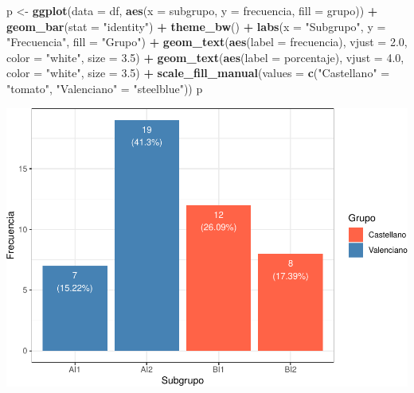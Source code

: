 \documentclass[
]{article}
\newenvironment{Shaded}{\begin{snugshade}}{\end{snugshade}}
\newcommand{\AttributeTok}[1]{\textcolor[rgb]{0.13,0.29,0.53}{#1}}
\newcommand{\FloatTok}[1]{\textcolor[rgb]{0.00,0.00,0.81}{#1}}
\newcommand{\FunctionTok}[1]{\textcolor[rgb]{0.13,0.29,0.53}{\textbf{#1}}}
\newcommand{\NormalTok}[1]{#1}
\newcommand{\OtherTok}[1]{\textcolor[rgb]{0.56,0.35,0.01}{#1}}
\newcommand{\SpecialCharTok}[1]{\textcolor[rgb]{0.81,0.36,0.00}{\textbf{#1}}}
\newcommand{\StringTok}[1]{\textcolor[rgb]{0.31,0.60,0.02}{#1}}
\begin{document}
\begin{Shaded}
\begin{Highlighting}[]
\NormalTok{p }\OtherTok{\textless{}{-}} \FunctionTok{ggplot}\NormalTok{(}\AttributeTok{data =}\NormalTok{ df, }\FunctionTok{aes}\NormalTok{(}\AttributeTok{x =}\NormalTok{ subgrupo, }\AttributeTok{y =}\NormalTok{ frecuencia, }\AttributeTok{fill =}\NormalTok{ grupo)) }\SpecialCharTok{+} 
  \FunctionTok{geom\_bar}\NormalTok{(}\AttributeTok{stat =} \StringTok{"identity"}\NormalTok{) }\SpecialCharTok{+}
  \FunctionTok{theme\_bw}\NormalTok{() }\SpecialCharTok{+} \FunctionTok{labs}\NormalTok{(}\AttributeTok{x =} \StringTok{"Subgrupo"}\NormalTok{, }\AttributeTok{y =} \StringTok{"Frecuencia"}\NormalTok{, }\AttributeTok{fill =} \StringTok{"Grupo"}\NormalTok{) }\SpecialCharTok{+}
  \FunctionTok{geom\_text}\NormalTok{(}\FunctionTok{aes}\NormalTok{(}\AttributeTok{label =}\NormalTok{ frecuencia), }\AttributeTok{vjust =} \FloatTok{2.0}\NormalTok{, }\AttributeTok{color =} \StringTok{"white"}\NormalTok{, }\AttributeTok{size =} \FloatTok{3.5}\NormalTok{) }\SpecialCharTok{+}
  \FunctionTok{geom\_text}\NormalTok{(}\FunctionTok{aes}\NormalTok{(}\AttributeTok{label =}\NormalTok{ porcentaje), }\AttributeTok{vjust =} \FloatTok{4.0}\NormalTok{, }\AttributeTok{color =} \StringTok{"white"}\NormalTok{, }\AttributeTok{size =} \FloatTok{3.5}\NormalTok{) }\SpecialCharTok{+}
  \FunctionTok{scale\_fill\_manual}\NormalTok{(}\AttributeTok{values =} \FunctionTok{c}\NormalTok{(}\StringTok{"Castellano"} \OtherTok{=} \StringTok{"tomato"}\NormalTok{, }\StringTok{"Valenciano"} \OtherTok{=} \StringTok{"steelblue"}\NormalTok{))}
\NormalTok{p}
\end{Highlighting}
\end{Shaded}

\includegraphics{informe_files/figure-latex/unnamed-chunk-3-1.pdf}
\end{document}

